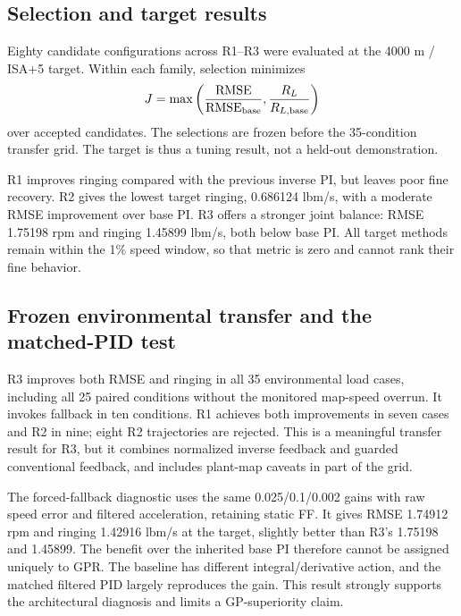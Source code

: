 \subsection{Selection and target results}
Eighty candidate configurations across R1--R3 were evaluated at the 4000 m / ISA+5 target. Within each family, selection minimizes
\begin{equation}
J=\max\left(\frac{\operatorname{RMSE}}{\operatorname{RMSE}_{\rm base}},\frac{R_L}{R_{L,\rm base}}\right)
\end{equation}
over accepted candidates. The selections are frozen before the 35-condition transfer grid. The target is thus a tuning result, not a held-out demonstration.


R1 improves ringing compared with the previous inverse PI, but leaves poor fine recovery. R2 gives the lowest target ringing, 0.686124 lbm/s, with a moderate RMSE improvement over base PI. R3 offers a stronger joint balance: RMSE 1.75198 rpm and ringing 1.45899 lbm/s, both below base PI. All target methods remain within the 1\% speed window, so that metric is zero and cannot rank their fine behavior.


\subsection{Frozen environmental transfer and the matched-PID test}

R3 improves both RMSE and ringing in all 35 environmental load cases, including all 25 paired conditions without the monitored map-speed overrun. It invokes fallback in ten conditions. R1 achieves both improvements in seven cases and R2 in nine; eight R2 trajectories are rejected. This is a meaningful transfer result for R3, but it combines normalized inverse feedback and guarded conventional feedback, and includes plant-map caveats in part of the grid.

The forced-fallback diagnostic uses the same 0.025/0.1/0.002 gains with raw speed error and filtered acceleration, retaining static FF. It gives RMSE 1.74912 rpm and ringing 1.42916 lbm/s at the target, slightly better than R3's 1.75198 and 1.45899. The benefit over the inherited base PI therefore cannot be assigned uniquely to GPR. The baseline has different integral/derivative action, and the matched filtered PID largely reproduces the gain. This result strongly supports the architectural diagnosis and limits a GP-superiority claim.

